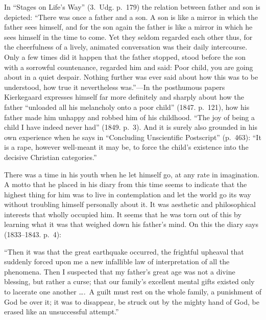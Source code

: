 \documentclass[12pt,a4paper]{book}
\newcommand{\opage}[1]{\marginnote{\footnotesize\textit{[#1]}}}
\begin{document}
In ``Stages on Life's Way'' (3.~Udg. p.~179) the relation between father
and son is depicted: ``There was once a father and a son. A son is like a
mirror in which the father sees himself, and for the son again the father
is like a mirror in which he sees himself in the time to come. Yet they
seldom regarded each other thus, for the cheerfulness of a lively,
animated conversation was their daily intercourse. Only a few times did
it happen that the father stopped, stood before the son with a sorrowful
countenance, regarded him and said: Poor child, you are going about in a
quiet despair. Nothing further was ever said about how this was to be
understood, how true it nevertheless was.''---In the posthumous papers
Kierkegaard expresses himself far more definitely and sharply about how
the father ``unloaded all his melancholy onto a poor child'' (1847.
p.~121), how his father made him unhappy and robbed him of his childhood.
``The joy of being a child I have indeed never had'' (1849. p.~3). And it
is surely also grounded in his own experience when
\opage{36}he says in ``Concluding Unscientific Postscript'' (p.~463): ``It
is a rape, however well-meant it may be, to force the child's existence
into the decisive Christian categories.''

There was a time in his youth when he let himself go, at any rate in
imagination. A motto that he placed in his diary from this time seems to
indicate that the highest thing for him was to live in contemplation and
let the world go its way without troubling himself personally about it.
It was aesthetic and philosophical interests that wholly occupied him. It
seems that he was torn out of this by learning what it was that weighed
down his father's mind. On this the diary says (1833--1843. p.~4):

``Then it was that the great earthquake occurred, the frightful upheaval
that suddenly forced upon me a new infallible law of interpretation of
all the phenomena. Then I suspected that my father's great age was not a
divine blessing, but rather a curse; that our family's excellent mental
gifts existed only to lacerate one another \dots.\ A guilt must rest on
the whole family, a punishment of God be over it; it was to disappear, be
struck out by the mighty hand of God, be erased like an unsuccessful
attempt.''
\end{document}
